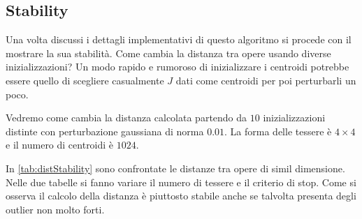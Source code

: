 \begin{toDo}
	\subsection{Stability}
	Una volta discussi i dettagli implementativi di questo algoritmo si procede con il mostrare la sua stabilità. Come cambia la distanza tra opere usando diverse inizializzazioni? Un modo rapido e rumoroso di inizializzare i centroidi potrebbe essere quello di scegliere casualmente $J$ dati come centroidi per poi perturbarli un poco.

	\noindent Vedremo come cambia la distanza calcolata partendo da $10$ inizializzazioni distinte con perturbazione gaussiana di norma $0.01$. La forma delle tessere è $4\times4$ e il numero di centroidi è $\num{1024}$.

	\noindent In \cref{tab:distStability} sono confrontate le distanze tra opere di simil dimensione. Nelle due tabelle si fanno variare il numero di tessere e il criterio di stop. Come si osserva il calcolo della distanza è piuttosto stabile anche se talvolta presenta degli outlier non molto forti.


\end{toDo}
